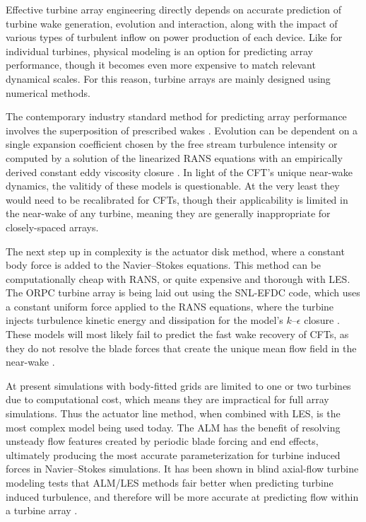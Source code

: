 Effective turbine array engineering directly depends on accurate prediction of
turbine wake generation, evolution and interaction, along with the impact of
various types of turbulent inflow on power production of each device. Like for
individual turbines, physical modeling is an option for predicting array
performance, though it becomes even more expensive to match relevant dynamical
scales. For this reason, turbine arrays are mainly designed using numerical
methods.

The contemporary industry standard method for predicting array performance
involves the superposition of prescribed wakes \cite{Stevens2014b}. Evolution
can be dependent on a single expansion coefficient chosen by the free stream
turbulence intensity \cite{Jensen1983, Choi2013} or computed by a solution of
the linearized RANS equations with an empirically derived constant eddy
viscosity closure \cite{Ainslie1988}. In light of the CFT's unique near-wake
dynamics, the valitidy of these models is questionable. At the very least they
would need to be recalibrated for CFTs, though their applicability is limited in
the near-wake of any turbine, meaning they are generally inappropriate for
closely-spaced arrays.
	
The next step up in complexity is the actuator disk method, where a constant
body force is added to the Navier--Stokes equations. This method can be
computationally cheap with RANS, or quite expensive and thorough with LES. The
ORPC turbine array is being laid out using the SNL-EFDC code, which uses a
constant uniform force applied to the RANS equations, where the turbine injects
turbulence kinetic energy and dissipation for the model's $k$--$\epsilon$
closure \cite{Nelson2013}. These models will most likely fail to predict the
fast wake recovery of CFTs, as they do not resolve the blade forces that create
the unique mean flow field in the near-wake \cite{Bachant2015-JoT}.
	
At present simulations with body-fitted grids are limited to one or two turbines
due to computational cost, which means they are impractical for full array
simulations. Thus the actuator line method, when combined with LES, is the most
complex model being used today. The ALM has the benefit of resolving unsteady
flow features created by periodic blade forcing and end effects, ultimately
producing the most accurate parameterization for turbine induced forces in
Navier--Stokes simulations. It has been shown in blind axial-flow turbine
modeling tests that ALM/LES methods fair better when predicting turbine induced
turbulence, and therefore will be more accurate at predicting flow within a
turbine array \cite{Krogstad2013}.


